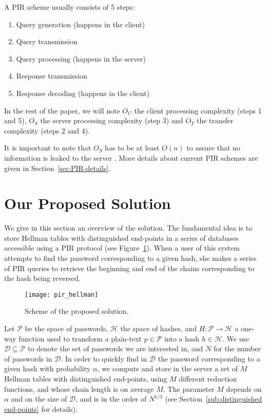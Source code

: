 \documentclass{llncs}
\def \CalD {\mathcal{D}}
\def \CalH {\mathcal{H}}
\def \CalP {\mathcal{P}}
\begin{document}
A PIR scheme usually consists of 5 steps:
\begin{enumerate}
\item Query generation (happens in the client)
\item Query transmission
\item Query processing (happens in the server)
\item Response transmission
\item Response decoding (happens in the client)
\end{enumerate}

In the rest of the paper, we will note 
$O_{C}$ the client processing complexity (steps 1 and 5), 
$O_{S}$ the server processing complexity (step 3) and 
$O_{T}$ the transfer complexity (steps 2 and 4). 

It is important to note that $O_{S}$ has to be at least $O(n)$ 
to assure that no information is leaked to the server \cite{paper:pir_survey}. 
More details about current PIR schemes are given in Section~\ref{sec:PIR-details}.






\section{Our Proposed Solution} \label{sec:solution}



We give in this section an overview of the solution.
The fundamental idea is to store Hellman tables with
distinguished end-points in a series of databases accessible using
a PIR protocol (see Figure~\ref{fig:scheme}). 
When a user of this system
attempts to find the password corresponding to a given hash, she makes a series of
PIR queries to retrieve the beginning and end of
the chains corresponding to the hash being reversed.

\begin{figure}[ht]
\centering
\texttt{[image: pir\_hellman]}
\caption{Scheme of the proposed solution.} \label{fig:scheme}
\end{figure}

Let $\CalP$ be the space of passwords, $\CalH$ the space of hashes,
and $H : \CalP \rightarrow \CalH$ a one-way function used to transform 
a plain-text $p \in \CalP$ into a hash $ h \in \CalH$.
We use $\CalD \subseteq \CalP$ to denote the set of passwords 
we are interested in,
and $N$ for the number of passwords in $\CalD$. 
In order to quickly find in $\CalD$ the password corresponding to a given hash 
with probability $\alpha$, 
we compute and store in the server a set of $M$ Hellman
tables with distinguished end-points, using $M$ different reduction
functions, and whose chain length is on average $M$.
The parameter $M$ depends on $\alpha$ and on the size of $\CalD$,
and is in the order of $N^{1/3}$
(see Section~\ref{sub:distinguished end-points} for details). 
\end{document}
